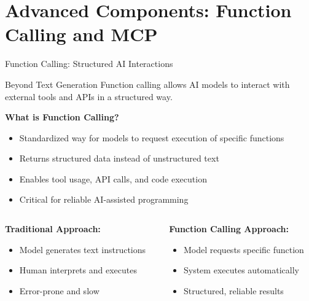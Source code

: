 \documentclass{beamer}
\begin{document}
\section{Advanced Components: Function Calling and MCP}

\begin{frame}[t]{Function Calling: Structured AI Interactions}
    \begin{block}{Beyond Text Generation}
        Function calling allows AI models to interact with external tools and APIs in a structured way.
    \end{block}
    
    \textbf{What is Function Calling?}
    \begin{itemize}
        \item Standardized way for models to request execution of specific functions
        \item Returns structured data instead of unstructured text
        \item Enables tool usage, API calls, and code execution
        \item Critical for reliable AI-assisted programming
    \end{itemize}
    
    \begin{columns}[t]
        \begin{column}{0.5\textwidth}
            \textbf{Traditional Approach:}
            \begin{itemize}
                \item Model generates text instructions
                \item Human interprets and executes
                \item Error-prone and slow
            \end{itemize}
        \end{column}
        \begin{column}{0.5\textwidth}
            \textbf{Function Calling Approach:}
            \begin{itemize}
                \item Model requests specific function
                \item System executes automatically
                \item Structured, reliable results
            \end{itemize}
        \end{column}
    \end{columns}
\end{frame}
\end{document}
